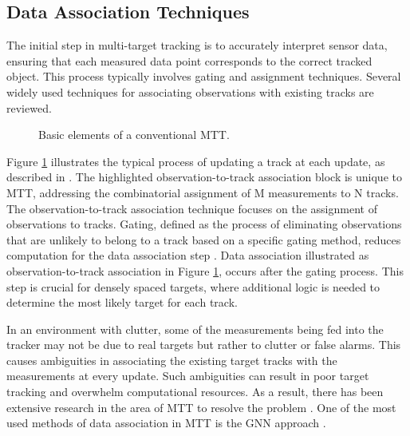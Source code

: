 \subsection{Data Association Techniques}
The initial step in multi-target tracking is to accurately interpret sensor data, ensuring that each measured data point corresponds to the correct tracked object. This process typically involves gating and assignment techniques. Several widely used techniques for associating observations with existing tracks are reviewed.
\newline
\newline
\begin{figure}[htb!]
	\centering
    
	\caption{Basic elements of a conventional MTT.}
	\label{fig:MTT_Diagram}
\end{figure}
\newline
Figure \ref{fig:MTT_Diagram} illustrates the typical process of updating a track at each update, as described in \cite{Blackman}. The highlighted observation-to-track association block is unique to \ac{MTT}, addressing the combinatorial assignment of M measurements to N tracks. The observation-to-track association technique focuses on the assignment of observations to tracks. Gating, defined as the process of eliminating observations that are unlikely to belong to a track based on a specific gating method, reduces computation for the data association step \cite{Konstantinova2003}. Data association illustrated as observation-to-track association in Figure \ref{fig:MTT_Diagram}, occurs after the gating process. This step is crucial for densely spaced targets, where additional logic is needed to determine the most likely target for each track.

In an environment with clutter, some of the measurements being fed into the tracker may not be due to real targets but rather to clutter or false alarms. This causes ambiguities in associating the existing target tracks with the measurements at every update. Such ambiguities can result in poor target tracking and overwhelm computational resources. As a result, there has been extensive research in the area of \ac{MTT} to resolve the problem \cite{Blackman}. One of the most used methods of data association in \ac{MTT} is the \ac{GNN} approach \cite{Liu2022,Shi2013,Konstantinova2003}.

